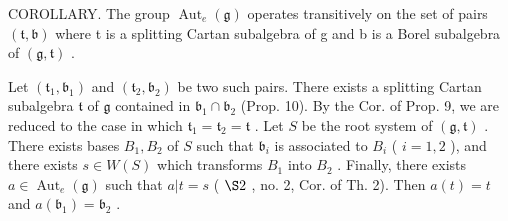 COROLLARY. The group \(\operatorname{Aut}_{e}(\mathfrak{g})\) operates transitively on the set of pairs \((\mathfrak{t},\mathfrak{b})\) where t is a splitting Cartan subalgebra of g and b is a Borel subalgebra of \((\mathfrak{g},\mathfrak{t})\) .

Let \((\mathfrak{t}_1, \mathfrak{b}_1)\) and \((\mathfrak{t}_2, \mathfrak{b}_2)\) be two such pairs. There exists a splitting Cartan subalgebra \(\mathfrak{t}\) of \(\mathfrak{g}\) contained in \(\mathfrak{b}_1 \cap \mathfrak{b}_2\) (Prop. 10). By the Cor. of Prop. 9, we are reduced to the case in which \(\mathfrak{t}_1 = \mathfrak{t}_2 = \mathfrak{t}\) . Let \(S\) be the root system of \((\mathfrak{g}, \mathfrak{t})\) . There exists bases \(B_1, B_2\) of \(S\) such that \(\mathfrak{b}_i\) is associated to \(B_i\) ( \(i = 1, 2\) ), and there exists \(s \in W(S)\) which transforms \(B_1\) into \(B_2\) . Finally, there exists \(a \in \operatorname{Aut}_e(\mathfrak{g})\) such that \(a|t = s\) ( \(\S 2\) , no. 2, Cor. of Th. 2). Then \(a(t) = t\) and \(a(\mathfrak{b}_1) = \mathfrak{b}_2\) .

